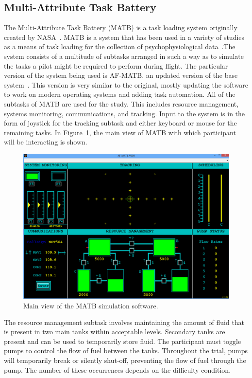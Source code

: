 \documentclass[11pt]{article}
\begin{document}
\subsection{Multi-Attribute Task Battery}
The Multi-Attribute Task Battery (MATB) is a task loading system originally created by NASA~\cite{Comstock}. MATB is a system that has been used in a variety of studies as a means of task loading for the collection of psychophysiological data~\cite{Wilson, Smith, Wang_Z}.The system consists of a multitude of subtasks arranged in such a way as to simulate the tasks a pilot might be required to perform during flight. The particular version of the system being used is AF-MATB, an updated version of the base system~\cite{Estepp}. This version is very similar to the original, mostly updating the software to work on modern operating systems and adding task automation. All of the subtasks of MATB are used for the study. This includes resource management, systems monitoring, communications, and tracking. Input to the system is in the form of joystick for the tracking subtask and either keyboard or mouse for the remaining tasks. In Figure~\ref{fig:matb}, the main view of MATB with which participant will be interacting is shown.

\begin{figure}[p]
    \centering
    \includegraphics[width=\linewidth]{figures/matb.png}
    \caption{Main view of the MATB simulation software. }
    \label{fig:matb}
\end{figure}

The resource management subtask involves maintaining the amount of fluid that is present in two main tanks within acceptable levels. Secondary tanks are present and can be used to temporarily store fluid. The participant must toggle pumps to control the flow of fuel between the tanks. Throughout the trial, pumps will temporarily break or silently shut-off, preventing the flow of fuel through the pump. The number of these occurrences depends on the difficulty condition.
\end{document}
